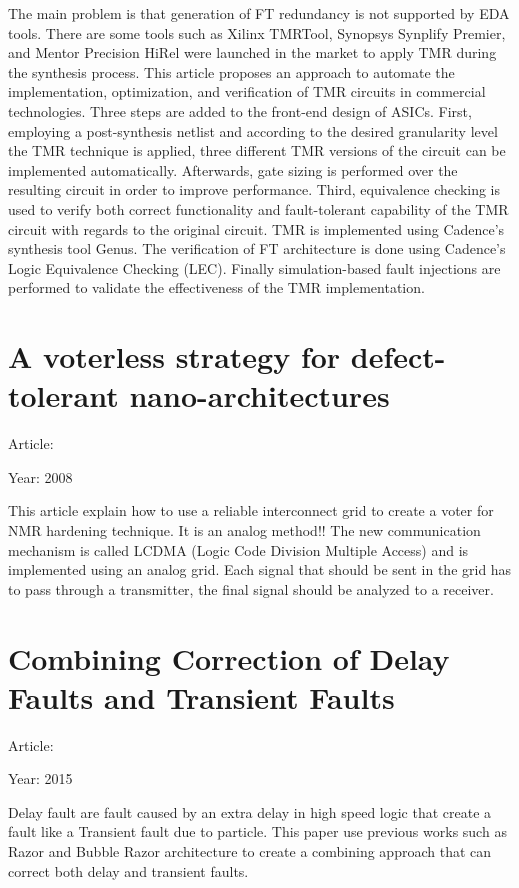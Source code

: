 {{		The main problem is that generation of FT redundancy is not supported by EDA tools. There are some tools such as Xilinx TMRTool, Synopsys Synplify Premier, and Mentor Precision HiRel were launched in the market to apply TMR during the synthesis process.
		This article  proposes an approach to automate the implementation, optimization, and verification of TMR circuits in commercial technologies. Three steps are added to the front-end design of ASICs. First, employing a post-synthesis netlist and according to the desired granularity level the TMR technique is applied, three different TMR versions of the circuit can be implemented automatically. Afterwards, gate sizing is performed over the resulting circuit in order to improve performance. Third, equivalence checking is used to verify both correct functionality and fault-tolerant capability of the TMR circuit with regards to the original circuit.
		TMR is implemented using Cadence’s synthesis tool Genus. The verification of FT architecture is done using Cadence’s Logic Equivalence Checking (LEC). Finally  simulation-based fault injections are performed to validate the effectiveness of the TMR implementation. 
	}
	\section{A voterless strategy for defect-tolerant nano-architectures}{
		Article: \cite{Voterless_defect_tolerance}
		
		Year: 2008
		
		This article explain how to use a reliable interconnect grid to create a voter for NMR hardening technique. It is an analog method!!
		The new communication mechanism is called LCDMA (Logic Code Division Multiple Access) and is implemented using an analog grid. Each signal that should be sent in the grid has to pass through a transmitter, the final signal should be analyzed to a receiver.
	}
	\section{Combining Correction of Delay Faults and Transient Faults}{
		Article: \cite{Combining_DelayF_and_TransF}
		
		Year: 2015
		
		Delay fault are fault caused by an extra delay in high speed logic that create a fault like a Transient fault due to particle. This paper use previous works such as Razor and Bubble Razor architecture to create a combining approach that can correct both delay and transient faults.
	}
}
